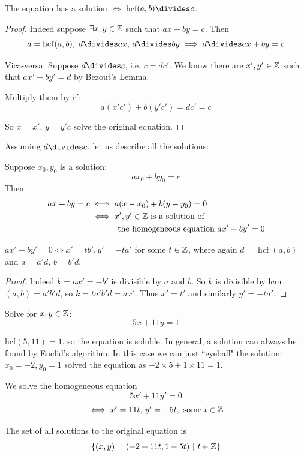 \documentclass[10pt]{scrartcl}
\DeclareMathOperator{\hcf}{hcf}
\begin{document}
\vspace*{5pt}

\begin{remark}
The equation has a solution $\iff$ hcf$(a,b) \divides c$. 

\begin{proof}Indeed suppose $\exists x,y \in\mathbb{Z}$ such that $ax + by = c$. Then \[d = \hcf(a,b),\; d \divides ax,\, d\divides by \implies d \divides ax + by = c\] 

Vica-versa: Suppose $d \divides c$, i.e. $c = dc'$. We know there are $x', y' \in\mathbb{Z}$ such that $ax' + by' = d$ by Bezout's Lemma. 

Multiply them by $c'$: 
\[a(x'c') + b(y'c') = dc' = c\]	

So $x = x',\, y = y'c$ solve the original equation.\end{proof}
\end{remark}

Assuming $d \divides c$, let us describe all the solutions:
\begin{remark}
Suppose $x_0, y_0$ is a solution: 
\[ax_0 + by_0 = c\]	
Then 
\[
\begin{aligned}
  ax + by = c &\iff a(x-x_0) + b(y-y_0) = 0\\
  &\iff x',y' \in\mathbb{Z} \text{ is a solution of}\\
  & \qquad \quad \text{ the homogeneous equation } ax' + by' = 0
\end{aligned}
\]
\end{remark}\vspace*{5pt}

\begin{remark}
$ax' + by' = 0 \iff x' = tb', y' = -ta'$ for some $t \in\mathbb{Z}$, where again $d = \hcf(a,b)$ and $a = a'd,\, b = b'd$. 

\begin{proof}Indeed $k = ax' = -b'$ is divisible by $a$ and $b$. So $k$ is divisible by lcm$(a,b) = a'b'd$, so $k= ta'b'd = ax'$. Thus $x' = t'$ and similarly $y' = -ta'$. \end{proof}
\end{remark}\vspace*{5pt}

\begin{example}
Solve for $x,y \in\mathbb{Z}$: 
\[5x + 11y = 1\]	

hcf$(5,11) = 1$, so the equation is soluble. In general, a solution can always be found by Euclid's algorithm. In this case we can just ``eyeball" the solution: $x_0 = -2, y_0 = 1$ solved the equation as $-2 \times 5 + 1 \times 11 = 1$. 

We solve the homogeneous equation
\[5x' + 11y' = 0\]
\[\iff x' = 11t,\, y' = -5t, \text{ some } t \in\mathbb{Z}\]

The set of all solutions to the original equation is 
\[\{(x,y) = (-2 + 11t, 1-5t) ~|~ t \in\mathbb{Z}\}\]
\end{example}\vspace*{5pt}
\end{document}
